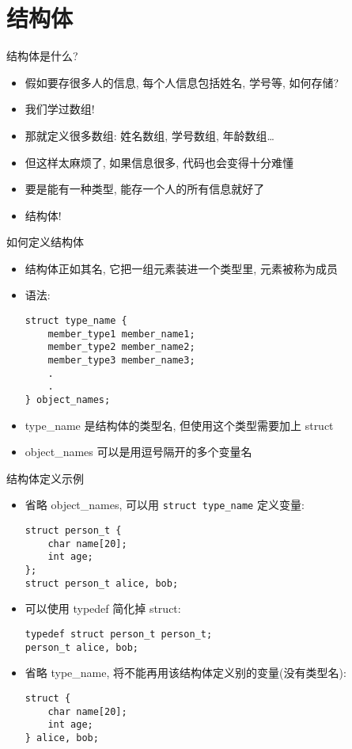 \section{结构体}\label{sec:结构体}

\begin{frame}[fragile]{结构体是什么?}
    \begin{itemize}[<+- | alert@+>]
        \item 假如要存很多人的信息, 每个人信息包括姓名, 学号等, 如何存储?
        \item 我们学过数组!
        \item 那就定义很多数组: 姓名数组, 学号数组, 年龄数组\ldots
        \item 但这样太麻烦了, 如果信息很多, 代码也会变得十分难懂
        \item 要是能有一种类型, 能存一个人的所有信息就好了
        \item 结构体!
    \end{itemize}
\end{frame}

\begin{frame}[fragile]{如何定义结构体}
    \begin{itemize}[<+- | alert@+>]
        \item 结构体正如其名, 它把一组元素装进一个类型里, 元素被称为成员
        \item 语法:
        \begin{verbatim}
struct type_name {
    member_type1 member_name1;
    member_type2 member_name2;
    member_type3 member_name3;
    .
    .
} object_names;
        \end{verbatim}
        \item type\_name 是结构体的类型名, 但使用这个类型需要加上 struct
        \item object\_names 可以是用逗号隔开的多个变量名
    \end{itemize}
\end{frame}

\begin{frame}[fragile]{结构体定义示例}
    \begin{itemize}[<+- | alert@+>]
        \item 省略 object\_names, 可以用 \texttt{struct type\_name} 定义变量:
        \scriptsize\begin{verbatim}
struct person_t {
    char name[20];
    int age;
};
struct person_t alice, bob;
        \end{verbatim}
        \item 可以使用 typedef 简化掉 struct:
        \scriptsize\begin{verbatim}
typedef struct person_t person_t;
person_t alice, bob;
        \end{verbatim}
        \item 省略 type\_name, 将不能再用该结构体定义别的变量(没有类型名):
        \scriptsize\begin{verbatim}
struct {
    char name[20];
    int age;
} alice, bob;
        \end{verbatim}
    \end{itemize}
\end{frame}

